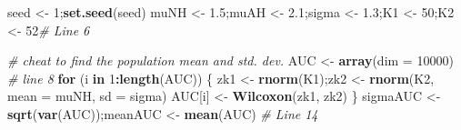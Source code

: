 \documentclass[
]{book}
\newenvironment{Shaded}{\begin{snugshade}}{\end{snugshade}}
\newcommand{\CommentTok}[1]{\textcolor[rgb]{0.56,0.35,0.01}{\textit{#1}}}
\newcommand{\ControlFlowTok}[1]{\textcolor[rgb]{0.13,0.29,0.53}{\textbf{#1}}}
\newcommand{\DataTypeTok}[1]{\textcolor[rgb]{0.13,0.29,0.53}{#1}}
\newcommand{\DecValTok}[1]{\textcolor[rgb]{0.00,0.00,0.81}{#1}}
\newcommand{\FloatTok}[1]{\textcolor[rgb]{0.00,0.00,0.81}{#1}}
\newcommand{\KeywordTok}[1]{\textcolor[rgb]{0.13,0.29,0.53}{\textbf{#1}}}
\newcommand{\NormalTok}[1]{#1}
\newcommand{\OperatorTok}[1]{\textcolor[rgb]{0.81,0.36,0.00}{\textbf{#1}}}
\newcommand{\StringTok}[1]{\textcolor[rgb]{0.31,0.60,0.02}{#1}}
\begin{document}
\begin{Shaded}
\begin{Highlighting}[]
\NormalTok{seed \textless{}{-}}\StringTok{ }\DecValTok{1}\NormalTok{;}\KeywordTok{set.seed}\NormalTok{(seed)}
\NormalTok{muNH \textless{}{-}}\StringTok{ }\FloatTok{1.5}\NormalTok{;muAH \textless{}{-}}\StringTok{ }\FloatTok{2.1}\NormalTok{;sigma \textless{}{-}}\StringTok{ }\FloatTok{1.3}\NormalTok{;K1 \textless{}{-}}\StringTok{ }\DecValTok{50}\NormalTok{;K2 \textless{}{-}}\StringTok{ }\DecValTok{52}\CommentTok{\# Line 6}

\CommentTok{\# cheat to find the population mean and std. dev.}
\NormalTok{AUC \textless{}{-}}\StringTok{ }\KeywordTok{array}\NormalTok{(}\DataTypeTok{dim =} \DecValTok{10000}\NormalTok{) }\CommentTok{\# line 8}
\ControlFlowTok{for}\NormalTok{ (i }\ControlFlowTok{in} \DecValTok{1}\OperatorTok{:}\KeywordTok{length}\NormalTok{(AUC)) \{}
\NormalTok{  zk1 \textless{}{-}}\StringTok{ }\KeywordTok{rnorm}\NormalTok{(K1);zk2 \textless{}{-}}\StringTok{ }\KeywordTok{rnorm}\NormalTok{(K2, }\DataTypeTok{mean =}\NormalTok{ muNH, }\DataTypeTok{sd =}\NormalTok{ sigma)  }
\NormalTok{  AUC[i] \textless{}{-}}\StringTok{ }\KeywordTok{Wilcoxon}\NormalTok{(zk1, zk2)}
\NormalTok{\}}
\NormalTok{sigmaAUC \textless{}{-}}\StringTok{ }\KeywordTok{sqrt}\NormalTok{(}\KeywordTok{var}\NormalTok{(AUC));meanAUC \textless{}{-}}\StringTok{ }\KeywordTok{mean}\NormalTok{(AUC) }\CommentTok{\# Line 14}


\end{Highlighting}
\end{Shaded}
\end{document}
